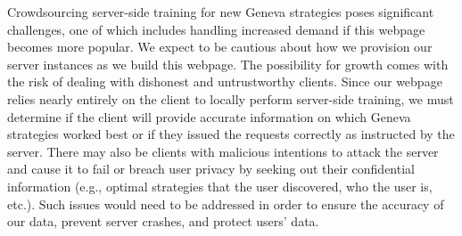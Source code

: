 
Crowdsourcing server-side training for new Geneva strategies poses significant challenges, one of which includes handling increased demand if this webpage becomes more popular. We expect to be cautious about how we provision our server instances as we build this webpage. The possibility for growth comes with the risk of dealing with dishonest and untrustworthy clients. Since our webpage relies nearly entirely on the client to locally perform server-side training, we must determine if the client will provide accurate information on which Geneva strategies worked best or if they issued the requests correctly as instructed by the server. There may also be clients with malicious intentions to attack the server and cause it to fail or breach user privacy by seeking out their confidential information (e.g., optimal strategies that the user discovered, who the user is, etc.). Such issues would need to be addressed in order to ensure the accuracy of our data, prevent server crashes, and protect users’ data.
